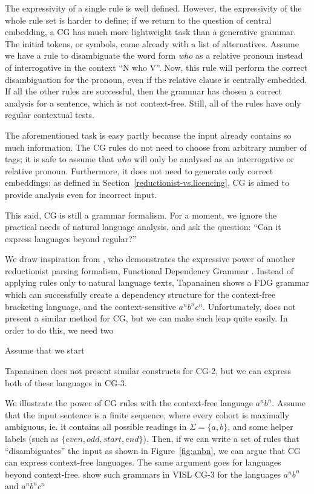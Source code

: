 The expressivity of a single rule is well defined. However, the expressivity of the whole rule set is harder to define; if we return to the question of central embedding, a CG has much more lightweight task than a generative grammar. The initial tokens, or symbols, come already with a list of alternatives.
Assume we have a rule to disambiguate the word form \emph{who} as a relative pronoun instead of interrogative in the context ``N who V''. %
Now, this rule will perform the correct disambiguation for the pronoun, even if the relative clause is centrally embedded. If all the other rules are successful, then the grammar has chosen a correct analysis for a sentence, which is not context-free. Still, 
all of the rules have only regular contextual tests.

The aforementioned task is easy partly because the input already contains so much information. The CG rules do not need to choose from arbitrary number of tags; it is safe to assume that \emph{who} will only be analysed as an interrogative or  relative pronoun. Furthermore, it does not need to generate only correct embeddings: as defined in Section~\ref{reductionist-vs.licencing}, CG is aimed to provide analysis even for incorrect input.

This said, CG is still a grammar formalism. For a moment, we ignore the practical needs of natural language analysis, and ask the question: ``Can it express languages beyond regular?'' 

We draw inspiration from \cite{tapanainen1999phd}, who demonstrates the expressive power of another reductionist parsing formalism, Functional Dependency Grammar .
Instead of applying rules only to natural language texts, Tapanainen shows a FDG grammar which can successfully create a dependency structure for the context-free bracketing language, and the context-sensitive $a^nb^nc^n$. 
Unfortunately, \cite{tapanainen1999phd} does not present a similar method for CG, but we can make such leap quite easily. In order to do this, we need two 

Assume that we start

Tapanainen does not present similar constructs for CG-2, but we can express both of these languages in CG-3.

We illustrate the power of CG rules with the context-free language $a^nb^n$.
Assume that the input sentence is a finite sequence, where every cohort is maximally ambiguous, ie. it contains all possible readings in $\Sigma = \{a, b\}$, and some helper labels (such as $\{even, odd, start, end\}$). Then, if we can write a set of rules that ``disambiguates'' the input as shown in Figure~\ref{fig:anbn}, we can argue that CG can express context-free languages. The same argument goes for languages beyond context-free.  show such grammars in VISL CG-3 for the languages $a^nb^n$ and $a^nb^nc^n$

